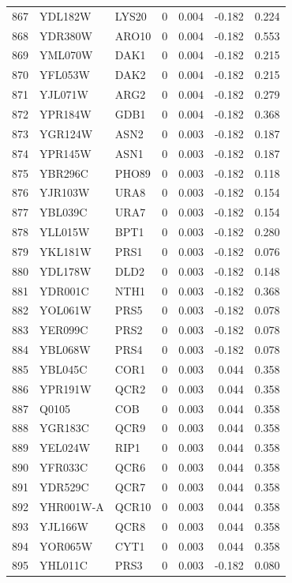 \begin{longtable}{rllrrrr}
867 & YDL182W & LYS20 & 0 & 0.004 & -0.182 & 0.224\\
868 & YDR380W & ARO10 & 0 & 0.004 & -0.182 & 0.553\\
869 & YML070W & DAK1 & 0 & 0.004 & -0.182 & 0.215\\
870 & YFL053W & DAK2 & 0 & 0.004 & -0.182 & 0.215\\
871 & YJL071W & ARG2 & 0 & 0.004 & -0.182 & 0.279\\
872 & YPR184W & GDB1 & 0 & 0.004 & -0.182 & 0.368\\
873 & YGR124W & ASN2 & 0 & 0.003 & -0.182 & 0.187\\
874 & YPR145W & ASN1 & 0 & 0.003 & -0.182 & 0.187\\
875 & YBR296C & PHO89 & 0 & 0.003 & -0.182 & 0.118\\
876 & YJR103W & URA8 & 0 & 0.003 & -0.182 & 0.154\\
877 & YBL039C & URA7 & 0 & 0.003 & -0.182 & 0.154\\
878 & YLL015W & BPT1 & 0 & 0.003 & -0.182 & 0.280\\
879 & YKL181W & PRS1 & 0 & 0.003 & -0.182 & 0.076\\
880 & YDL178W & DLD2 & 0 & 0.003 & -0.182 & 0.148\\
881 & YDR001C & NTH1 & 0 & 0.003 & -0.182 & 0.368\\
882 & YOL061W & PRS5 & 0 & 0.003 & -0.182 & 0.078\\
883 & YER099C & PRS2 & 0 & 0.003 & -0.182 & 0.078\\
884 & YBL068W & PRS4 & 0 & 0.003 & -0.182 & 0.078\\
885 & YBL045C & COR1 & 0 & 0.003 & 0.044 & 0.358\\
886 & YPR191W & QCR2 & 0 & 0.003 & 0.044 & 0.358\\
887 & Q0105 & COB & 0 & 0.003 & 0.044 & 0.358\\
888 & YGR183C & QCR9 & 0 & 0.003 & 0.044 & 0.358\\
889 & YEL024W & RIP1 & 0 & 0.003 & 0.044 & 0.358\\
890 & YFR033C & QCR6 & 0 & 0.003 & 0.044 & 0.358\\
891 & YDR529C & QCR7 & 0 & 0.003 & 0.044 & 0.358\\
892 & YHR001W-A & QCR10 & 0 & 0.003 & 0.044 & 0.358\\
893 & YJL166W & QCR8 & 0 & 0.003 & 0.044 & 0.358\\
894 & YOR065W & CYT1 & 0 & 0.003 & 0.044 & 0.358\\
895 & YHL011C & PRS3 & 0 & 0.003 & -0.182 & 0.080\\

\end{longtable}
